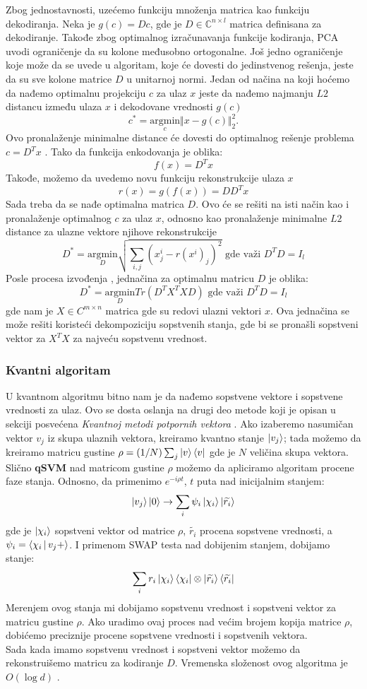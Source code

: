 \documentclass[12pt, letterpaper, oneside]{article}
\begin{document}
Zbog jednostavnosti, uzećemo funkciju množenja matrica kao funkciju dekodiranja. Neka je $g(c)=Dc$, gde je
$D \in \mathbb{C}^{n \times l}$ matrica definisana za dekodiranje. Takođe zbog optimalnog izračunavanja funkcije kodiranja, 
PCA uvodi ograničenje da su kolone međusobno ortogonalne. Još jedno ograničenje koje može da se uvede u algoritam,
koje će dovesti do jedinstvenog rešenja, jeste da su sve kolone matrice $D$ u unitarnoj normi.
Jedan od načina na koji hoćemo da nađemo optimalnu projekciju $c$ za ulaz $x$ jeste da nađemo najmanju $L2$ distancu između ulaza $x$ i dekodovane vrednosti $g(c)$
\[
  c^{*} = \underset{c}{\mathrm{argmin}} \Vert x-g(c) \Vert_2^2.
\]
Ovo pronalaženje minimalne distance će dovesti do optimalnog rešenje problema $c=D^{T}x$ \cite{goodfellow2016deep}. Tako da funkcija enkodovanja je oblika:
\[
f(x) = D^T x
\]
Takođe, možemo da uvedemo novu funkciju rekonstrukcije ulaza $x$
\[
  r(x) = g(f(x)) = DD^T x
\]
Sada treba da se nađe optimalna matrica $D$. Ovo će se rešiti na isti način kao i pronalaženje optimalnog $c$ za ulaz $x$, odnosno kao pronalaženje minimalne $L2$ distance za ulazne vektore
njihove rekonstrukcije
\[
    D^{*} =\underset{D}{\mathrm{argmin}} \sqrt{\sum_{i,j}(x^i_j - r(x^i)_j)^2} \text{ gde važi } D^TD = I_l
\]
Posle procesa izvođenja \cite{goodfellow2016deep}, jednačina za optimalnu matricu $D$ je oblika:
\[
    D^{*} =\underset{D}{\mathrm{argmin}}  Tr(D^TX^TXD) \text{ gde važi } D^TD = I_l
\] 
gde nam je $X \in C^{m \times n}$ matrica gde su redovi ulazni vektori $x$. Ova jednačina se može rešiti koristeći dekompoziciju sopstvenih stanja,
gde bi se pronašli sopstveni vektor za $X^TX$ za najveću sopstvenu vrednost. 
\subsubsection{Kvantni algoritam}
U kvantnom algoritmu bitno nam je da nađemo sopstvene vektore i sopstvene vrednosti za ulaz. Ovo se dosta oslanja na drugi deo metode koji je opisan u sekciji posvećena \textit{Kvantnoj metodi potpornih vektora} .
Ako izaberemo nasumičan vektor $v_j$ iz skupa ulaznih vektora, kreiramo kvantno stanje $\Ket{v_j}$; tada možemo da kreiramo matricu gustine $\rho = (1/N)\sum_j\Ket{v}\Bra{v}$ gde je $N$ veličina skupa vektora. \cite{Quantum_machine_learning}
Slično \textbf{qSVM} nad matricom gustine $\rho$ možemo da apliciramo algoritam procene faze stanja. Odnosno, da primenimo $e^{-i \rho t}$, $t$ puta nad inicijalnim stanjem:
\[
    \Ket{v_j}\Ket{0} \to \sum_i \psi_i\Ket{\chi_i}\Ket{\widetilde{r_i}}
\] 
gde je $\Ket{\chi_i}$ sopstveni vektor od matrice $\rho$, $\widetilde{r_i}$ procena sopstvene vrednosti, a $\psi_i = \Braket{\chi_i|v_j+}$.
I primenom SWAP testa nad dobijenim stanjem, dobijamo stanje:
\[
    \sum_i r_i \Ket{\chi_i}\Bra{\chi_i}\otimes \Ket{\widetilde{r_i}}\Bra{\widetilde{r_i}}
\]
Merenjem ovog stanja mi dobijamo sopstvenu vrednost i sopstveni vektor za matricu gustine $\rho$. Ako uradimo ovaj proces nad većim brojem kopija matrice $\rho$, dobićemo preciznije procene sopstvene vrednosti i sopstvenih vektora. \\
Sada kada imamo sopstvenu vrednost i sopstveni vektor možemo da rekonstruišemo matricu za kodiranje $D$. Vremenska složenost ovog algoritma je $O(\log d)$ \cite{Lloyd_2014}.
\end{document}
